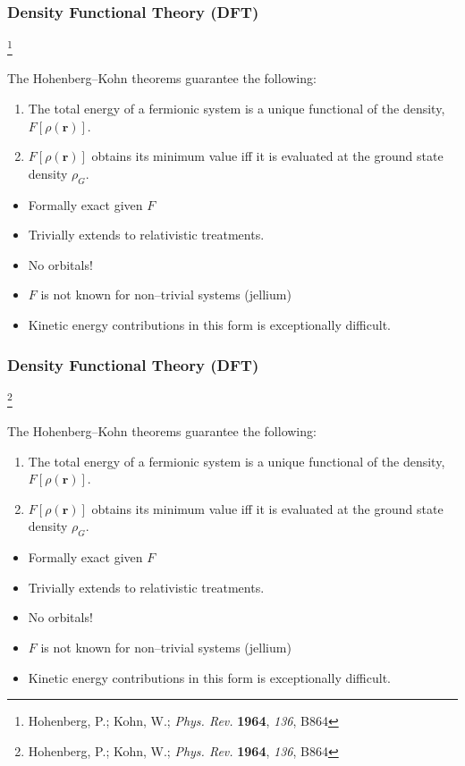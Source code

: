 \documentclass{beamer}
\newcommand\blfootnote[1]{%
  \begingroup
  \renewcommand\thefootnote{}\footnote{#1}%
  \addtocounter{footnote}{-1}%
  \endgroup
}
\begin{document}
\begin{frame}
\frametitle{Density Functional Theory (DFT)}
\blfootnote{Hohenberg, P.; Kohn, W.; \emph{Phys. Rev.} \textbf{1964}, \emph{136}, B864}

The Hohenberg--Kohn theorems guarantee the following:
\begin{enumerate}
  \item The total energy of a fermionic system is a unique functional of the density, $F[\rho(\mathbf{r})]$.
  \item $F[\rho(\mathbf{r})]$ obtains its minimum value iff it is evaluated at the ground state density $\rho_G$.
\end{enumerate}

\begin{itemize}
  \color{green}
  \item Formally exact given $F$
  \color{white}
  \item[\color{white}] Trivially extends to relativistic treatments.
  \item[\color{white}] No orbitals!
\end{itemize}

\begin{itemize}
  \color{white}
  \item[\color{white}] $F$ is not known for non--trivial systems (jellium)
  \item[\color{white}] Kinetic energy contributions in this form is exceptionally difficult.
\end{itemize}

\end{frame}

\begin{frame}
\frametitle{Density Functional Theory (DFT)}
\blfootnote{Hohenberg, P.; Kohn, W.; \emph{Phys. Rev.} \textbf{1964}, \emph{136}, B864}

The Hohenberg--Kohn theorems guarantee the following:
\begin{enumerate}
  \item The total energy of a fermionic system is a unique functional of the density, $F[\rho(\mathbf{r})]$.
  \item $F[\rho(\mathbf{r})]$ obtains its minimum value iff it is evaluated at the ground state density $\rho_G$.
\end{enumerate}

\begin{itemize}
  \color{green}
  \item Formally exact given $F$
  \item Trivially extends to relativistic treatments.
  \color{white}
  \item[\color{white}] No orbitals!
\end{itemize}

\begin{itemize}
  \color{white}
  \item[\color{white}] $F$ is not known for non--trivial systems (jellium)
  \item[\color{white}] Kinetic energy contributions in this form is exceptionally difficult.
\end{itemize}

\end{frame}
\end{document}
